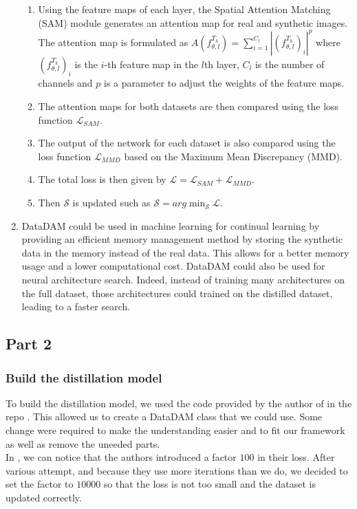 \documentclass[onecolumn]{IEEEtran}
\begin{document}
\begin{enumerate}[label=(\alph*)]
\begin{enumerate}[label=(\arabic*)]
        \item Using the feature maps of each layer, the Spatial Attention Matching (SAM) module generates an attention map for real and synthetic images. The attention map is formulated as $A(f_{\theta,l}^{T_k}) = \sum_{i=1}^{C_l} | (f_{\theta,l}^{T_k})_i|^p$ where $(f_{\theta,l}^{T_k})_i$ is the $i$-th feature map in the $l$th layer, $C_l$ is the number of channels and $p$ is a parameter to adjust the weights of the feature maps.
        \item The attention maps for both datasets are then compared using the loss function $\mathcal{L}_{SAM}$.
        \item The output of the network for each dataset is also compared using the loss function $\mathcal{L}_{MMD}$ based on the Maximum Mean Discrepancy (MMD).
        \item The total loss is then given by $\mathcal{L} = \mathcal{L}_{SAM} + \mathcal{L}_{MMD}$.
        \item Then $\mathcal{S}$ is updated such as $\mathcal{S} = arg \min_{\mathcal{S}} \mathcal{L}$.
    \end{enumerate}
    \vspace{3mm}
    \item DataDAM could be used in machine learning for continual learning by providing an efficient memory management method by storing the synthetic data in the memory instead of the real data. This allows for a better memory usage and a lower computational cost. DataDAM could also be used for neural architecture search. Indeed, instead of training many architectures on the full dataset, those architectures could trained on the distilled dataset, leading to a faster search.
\end{enumerate}

\subsection{Part 2}
\subsubsection{Build the distillation model}
To build the distillation model, we used the code provided by the author of \cite{sajedi2023datadam} in the repo \cite{githubGitHubDataDistillationDataDAM}. This allowed us to create a DataDAM class that we could use. Some change were required to make the understanding easier and to fit our framework as well as remove the uneeded parts.
\\
In \cite{githubGitHubDataDistillationDataDAM}, we can notice that the authors introduced a factor $100$ in their loss. After various attempt, and because they use more iterations than we do, we decided to set the factor to $10 000$ so that the loss is not too small and the dataset is updated correctly.
\end{document}
